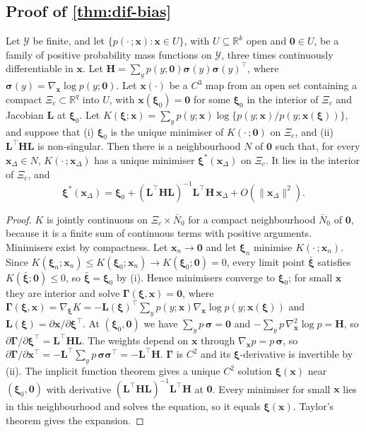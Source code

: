 \subsection{Proof of \texorpdfstring{\cref{thm:dif-bias}}{the DIF-bias theorem}}\label{app:pm-dif}

\begin{lemma}\label{lem:app-pseudo}
Let $\mathcal Y$ be finite, and let $\{p(\cdot\,;\bm x):\bm x\in U\}$, with $U\subseteq\mathbb R^k$ open and $\bm0\in U$, be a family of positive probability mass functions on $\mathcal Y$, three times continuously differentiable in $\bm x$. Let $\bm H=\sum_y p(y;\bm0)\bm\sigma(y)\bm\sigma(y)^\top$, where $\bm\sigma(y)=\nabla_{\bm x}\log p(y;\bm0)$. Let $\bm x(\cdot)$ be a $C^3$ map from an open set containing a compact $\Xi_c\subset\mathbb R^q$ into $U$, with $\bm x(\bm\xi_0)=\bm0$ for some $\bm\xi_0$ in the interior of $\Xi_c$ and Jacobian $\bm L$ at $\bm\xi_0$. Let $K(\bm\xi;\bm x)=\sum_yp(y;\bm x)\log\{p(y;\bm x)/p(y;\bm x(\bm\xi))\}$, and suppose that (i) $\bm\xi_0$ is the unique minimiser of $K(\cdot\,;\bm0)$ on $\Xi_c$, and (ii) $\bm L^\top\bm H\bm L$ is non-singular. Then there is a neighbourhood $N$ of $\bm0$ such that, for every $\bm x_\Delta\in N$, $K(\cdot\,;\bm x_\Delta)$ has a unique minimiser $\bm\xi^*(\bm x_\Delta)$ on $\Xi_c$. It lies in the interior of $\Xi_c$, and
\[
  \bm\xi^*(\bm x_\Delta)=\bm\xi_0+(\bm L^\top\bm H\bm L)^{-1}\bm L^\top\bm H\,\bm x_\Delta+O(\|\bm x_\Delta\|^2).
\]
\end{lemma}

\begin{proof}
$K$ is jointly continuous on $\Xi_c\times\bar N_0$ for a compact neighbourhood $\bar N_0$ of $\bm0$, because it is a finite sum of continuous terms with positive arguments. Minimisers exist by compactness. Let $\bm x_n\to\bm0$ and let $\bm\xi_n$ minimise $K(\cdot\,;\bm x_n)$. Since $K(\bm\xi_n;\bm x_n)\le K(\bm\xi_0;\bm x_n)\to K(\bm\xi_0;\bm0)=0$, every limit point $\bar{\bm\xi}$ satisfies $K(\bar{\bm\xi};\bm0)\le0$, so $\bar{\bm\xi}=\bm\xi_0$ by (i). Hence minimisers converge to $\bm\xi_0$; for small $\bm x$ they are interior and solve $\bm\Gamma(\bm\xi,\bm x)=\bm0$, where $\bm\Gamma(\bm\xi,\bm x)=\nabla_{\bm\xi}K=-\bm L(\bm\xi)^\top\sum_yp(y;\bm x)\nabla_{\bm x}\log p(y;\bm x(\bm\xi))$ and $\bm L(\bm\xi)=\partial\bm x/\partial\bm\xi^\top$. At $(\bm\xi_0,\bm0)$ we have $\sum_yp\,\bm\sigma=\bm0$ and $-\sum_yp\,\nabla^2_{\bm x}\log p=\bm H$, so $\partial\bm\Gamma/\partial\bm\xi^\top=\bm L^\top\bm H\bm L$. The weights depend on $\bm x$ through $\nabla_{\bm x}p=p\,\bm\sigma$, so $\partial\bm\Gamma/\partial\bm x^\top=-\bm L^\top\sum_yp\,\bm\sigma\bm\sigma^\top=-\bm L^\top\bm H$. $\bm\Gamma$ is $C^2$ and its $\bm\xi$-derivative is invertible by (ii). The implicit function theorem gives a unique $C^2$ solution $\bm\xi(\bm x)$ near $(\bm\xi_0,\bm0)$ with derivative $(\bm L^\top\bm H\bm L)^{-1}\bm L^\top\bm H$ at $\bm0$. Every minimiser for small $\bm x$ lies in this neighbourhood and solves the equation, so it equals $\bm\xi(\bm x)$. Taylor's theorem gives the expansion.
\end{proof}

